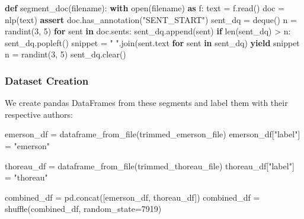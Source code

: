 \documentclass[
]{article}
\newenvironment{Shaded}{}{}
\newcommand{\BuiltInTok}[1]{\textcolor[rgb]{0.00,0.50,0.00}{#1}}
\newcommand{\ControlFlowTok}[1]{\textcolor[rgb]{0.00,0.44,0.13}{\textbf{#1}}}
\newcommand{\DecValTok}[1]{\textcolor[rgb]{0.25,0.63,0.44}{#1}}
\newcommand{\ImportTok}[1]{\textcolor[rgb]{0.00,0.50,0.00}{\textbf{#1}}}
\newcommand{\KeywordTok}[1]{\textcolor[rgb]{0.00,0.44,0.13}{\textbf{#1}}}
\newcommand{\NormalTok}[1]{#1}
\newcommand{\OperatorTok}[1]{\textcolor[rgb]{0.40,0.40,0.40}{#1}}
\newcommand{\StringTok}[1]{\textcolor[rgb]{0.25,0.44,0.63}{#1}}
\begin{document}
\begin{Shaded}
\begin{Highlighting}[]
\KeywordTok{def}\NormalTok{ segment\_doc(filename):}
    \ControlFlowTok{with} \BuiltInTok{open}\NormalTok{(filename) }\ImportTok{as}\NormalTok{ f:}
\NormalTok{        text }\OperatorTok{=}\NormalTok{ f.read()}
\NormalTok{    doc }\OperatorTok{=}\NormalTok{ nlp(text)}
    \ControlFlowTok{assert}\NormalTok{ doc.has\_annotation(}\StringTok{"SENT\_START"}\NormalTok{)}
\NormalTok{    sent\_dq }\OperatorTok{=}\NormalTok{ deque()}
\NormalTok{    n }\OperatorTok{=}\NormalTok{ randint(}\DecValTok{3}\NormalTok{, }\DecValTok{5}\NormalTok{)}
    \ControlFlowTok{for}\NormalTok{ sent }\KeywordTok{in}\NormalTok{ doc.sents:}
\NormalTok{        sent\_dq.append(sent)}
        \ControlFlowTok{if} \BuiltInTok{len}\NormalTok{(sent\_dq) }\OperatorTok{\textgreater{}}\NormalTok{ n:}
\NormalTok{            sent\_dq.popleft()}
\NormalTok{        snippet }\OperatorTok{=} \StringTok{" "}\NormalTok{.join(sent.text }\ControlFlowTok{for}\NormalTok{ sent }\KeywordTok{in}\NormalTok{ sent\_dq)}
        \ControlFlowTok{yield}\NormalTok{ snippet}
\NormalTok{        n }\OperatorTok{=}\NormalTok{ randint(}\DecValTok{3}\NormalTok{, }\DecValTok{5}\NormalTok{)}
\NormalTok{        sent\_dq.clear()}
\end{Highlighting}
\end{Shaded}

\subsubsection{Dataset Creation}\label{dataset-creation}

We create pandas DataFrames from these segments and label them with
their respective authors:

\begin{Shaded}
\begin{Highlighting}[]
\NormalTok{emerson\_df }\OperatorTok{=}\NormalTok{ dataframe\_from\_file(trimmed\_emerson\_file)}
\NormalTok{emerson\_df[}\StringTok{"label"}\NormalTok{] }\OperatorTok{=} \StringTok{"emerson"}

\NormalTok{thoreau\_df }\OperatorTok{=}\NormalTok{ dataframe\_from\_file(trimmed\_thoreau\_file)}
\NormalTok{thoreau\_df[}\StringTok{"label"}\NormalTok{] }\OperatorTok{=} \StringTok{"thoreau"}

\NormalTok{combined\_df }\OperatorTok{=}\NormalTok{ pd.concat([emerson\_df, thoreau\_df])}
\NormalTok{combined\_df }\OperatorTok{=}\NormalTok{ shuffle(combined\_df, random\_state}\OperatorTok{=}\DecValTok{7919}\NormalTok{)}
\end{Highlighting}
\end{Shaded}
\end{document}
